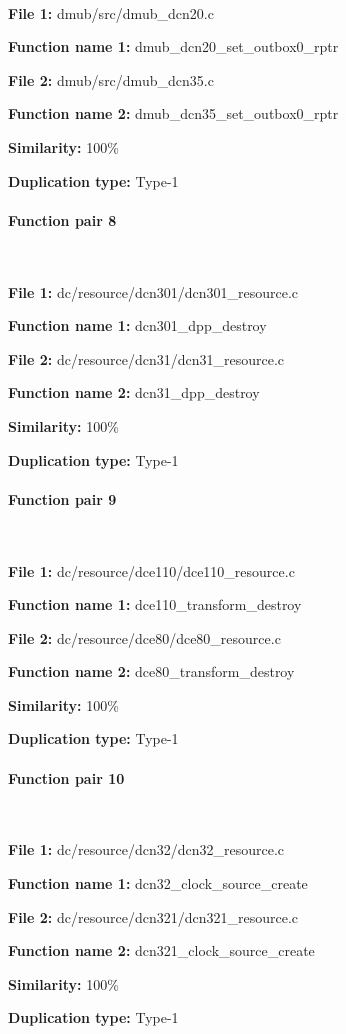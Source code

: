 \

\textbf{File 1:} dmub/src/dmub\_dcn20.c

\textbf{Function name 1:} dmub\_dcn20\_set\_outbox0\_rptr

\textbf{File 2:} dmub/src/dmub\_dcn35.c

\textbf{Function name 2:} dmub\_dcn35\_set\_outbox0\_rptr

\textbf{Similarity:} 100\%

\textbf{Duplication type:} Type-1


\paragraph{Function pair 8 }  

\

\textbf{File 1:} dc/resource/dcn301/dcn301\_resource.c

\textbf{Function name 1:} dcn301\_dpp\_destroy

\textbf{File 2:} dc/resource/dcn31/dcn31\_resource.c

\textbf{Function name 2:} dcn31\_dpp\_destroy

\textbf{Similarity:} 100\%

\textbf{Duplication type:} Type-1


\paragraph{Function pair 9 }  

\

\textbf{File 1:} dc/resource/dce110/dce110\_resource.c

\textbf{Function name 1:} dce110\_transform\_destroy

\textbf{File 2:} dc/resource/dce80/dce80\_resource.c

\textbf{Function name 2:} dce80\_transform\_destroy

\textbf{Similarity:} 100\%

\textbf{Duplication type:} Type-1


\paragraph{Function pair 10 }  

\

\textbf{File 1:} dc/resource/dcn32/dcn32\_resource.c

\textbf{Function name 1:} dcn32\_clock\_source\_create

\textbf{File 2:} dc/resource/dcn321/dcn321\_resource.c

\textbf{Function name 2:} dcn321\_clock\_source\_create

\textbf{Similarity:} 100\%

\textbf{Duplication type:} Type-1


